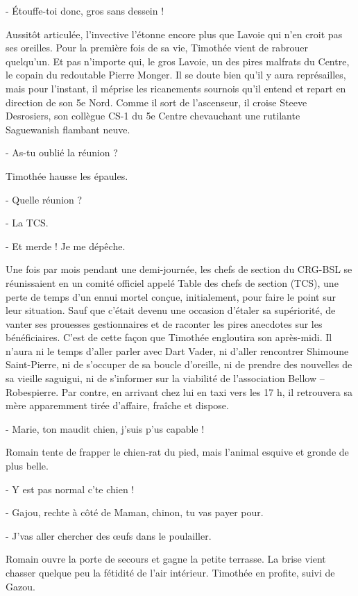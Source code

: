 - Étouffe-toi donc, gros sans dessein !

Aussitôt articulée, l’invective l’étonne encore plus que Lavoie qui n’en croit pas ses oreilles. Pour la première fois de sa vie, Timothée vient de rabrouer quelqu’un. Et pas n’importe qui, le gros Lavoie, un des pires malfrats du Centre, le copain du redoutable Pierre Monger. Il se doute bien qu’il y aura représailles, mais pour l’instant, il méprise les ricanements sournois qu’il entend et repart en direction de son 5e Nord. Comme il sort de l’ascenseur, il croise Steeve Desrosiers, son collègue CS-1 du 5e Centre chevauchant une rutilante Saguewanish flambant neuve.

- As-tu oublié la réunion ?

Timothée hausse les épaules.

- Quelle réunion ?

- La TCS.

- Et merde ! Je me dépêche.

Une fois par mois pendant une demi-journée, les chefs de section du CRG-BSL se réunissaient en un comité officiel appelé Table des chefs de section (TCS), une perte de temps d’un ennui mortel conçue, initialement, pour faire le point sur leur situation. Sauf que c’était devenu une occasion d’étaler sa supériorité, de vanter ses prouesses gestionnaires et de raconter les pires anecdotes sur les bénéficiaires. C’est de cette façon que Timothée engloutira son après-midi. Il n’aura ni le temps d’aller parler avec Dart Vader, ni d’aller rencontrer Shimoune Saint-Pierre, ni de s’occuper de sa boucle d’oreille, ni de prendre des nouvelles de sa vieille saguigui, ni de s’informer sur la viabilité de l’association Bellow – Robespierre. Par contre, en arrivant chez lui en taxi vers les 17 h, il retrouvera sa mère apparemment tirée d’affaire, fraîche et dispose.

- Marie, ton maudit chien, j’suis p’us capable !

Romain tente de frapper le chien-rat du pied, mais l’animal esquive et gronde de plus belle.

- Y est pas normal c’te chien !

- Gajou, rechte à côté de Maman, chinon, tu vas payer pour.

- J’vas aller chercher des œufs dans le poulailler.

Romain ouvre la porte de secours et gagne la petite terrasse. La brise vient chasser quelque peu la fétidité de l’air intérieur. Timothée en profite, suivi de Gazou.

